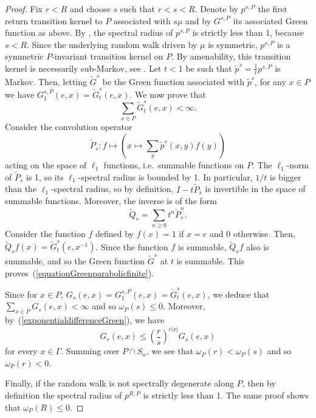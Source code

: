 \documentclass{amsart}
\theoremstyle{definition}
\theoremstyle{remark}
\begin{document}
\begin{proof}
Fix $r<R$ and choose $s$ such that $r<s<R$.
Denote by $p^{s,P}$ the first return transition kernel to $P$ associated with $s\mu$ and by $G^{s,P}$ its associated Green function as above.
By \cite[Lemma~4.15]{DG21}, the spectral radius of $p^{s,P}$ is strictly less than 1, because $s<R$.
Since the underlying random walk driven by $\mu$ is symmetric, $p^{s,P}$ is a symmetric $P$-invariant transition kernel on $P$.
By amenability, this transition kernel is necessarily sub-Markov, see \cite[Corollary~12.5]{Woessbook}.
Let $t<1$ be such that $\tilde{p}^s=\frac{1}{t}p^{s,P}$ is Markov.
Then, letting $\widetilde{G}^s$ be the Green function associated with $\tilde{p}^s$, for any $x\in P$ we have $G_1^{s,P}(e,x)=\widetilde{G}_t^s(e,x)$.
We now prove that
\begin{equation}\label{equationGreenparabolicfinite}
\sum_{x\in P}\widetilde{G}_t^s(e,x)<\infty.
\end{equation}
Consider the convolution operator
$$\widetilde{P}_s:f\mapsto \left ( x\mapsto \sum_{y}\tilde{p}^s(x,y)f(y)\right )$$
acting on the space of $\ell_1$ functions, i.e.\ summable functions on $P$.
The $\ell_1$-norm of $\widetilde{P}_s$ is 1, so its $\ell_1$-spectral radius is bounded by 1.
In particular, $1/t$ is bigger than the $\ell_1$-spectral radius, so by definition, $I-t\widetilde{P}_s$ is invertible in the space of summable functions.
Moreover, the inverse is of the form 
$$\widetilde{Q}_s=\sum_{n\geq 0} t^n\widetilde{P}_s^n.$$
Consider the function $f$ defined by $f(x)=1$ if $x=e$ and 0 otherwise.
Then, $\widetilde{Q}_sf(x)=\widetilde{G}_t^s(e,x^{-1})$.
Since the function $f$ is summable, $\widetilde{Q}_sf$ also is summable, and so the Green function $\widetilde{G}^s$ at $t$ is summable.
This proves~(\ref{equationGreenparabolicfinite}).

Since for $x\in P$, $G_s(e,x)=G_1^{s,P}(e,x)=\widetilde{G}_t^s(e,x)$,
we deduce that $\sum_{x\in P}G_s(e,x)<\infty$ and so
$\omega_P(s)\leq 0$.
Moreover, by~(\ref{exponentialdifferenceGreen}), we have
$$G_r(e,x)\leq \left(\frac{r}{s}\right)^{c|x|}G_s(e,x)$$ for every $x\in \Gamma$.
Summing over $P\cap S_n$, we see that $\omega_P(r)<\omega_P(s)$ and so $\omega_P(r)<0$.

Finally, if the random walk is not spectrally degenerate along $P$, then by definition the spectral radius of $p^{R,P}$ is strictly less than 1.
The same proof shows that $\omega_P(R)\leq 0$.
\end{proof}
 
 
\end{document}
